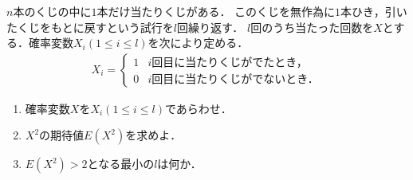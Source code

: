 \documentclass[../../main.tex]{subfiles}
\begin{document}
$n$本のくじの中に$1$本だけ当たりくじがある．
このくじを無作為に$1$本ひき，引いたくじをもとに戻すという試行を$l$回繰り返す．
$l$回のうち当たった回数を$X$とする．確率変数$X_i (1\le i\le l)$を次により定める．
\begin{align*}
  X_i=
  \begin{cases}
    1 & \text{$i$回目に当たりくじがでたとき，}  \\
    0 & \text{$i$回目に当たりくじがでないとき．}
  \end{cases}
\end{align*}
\begin{enumerate}
  \item 確率変数$X$を$X_i (1\le i\le l)$であらわせ．
  \item $X^2$の期待値$E(X^2)$を求めよ．
  \item $E(X^2)>2$となる最小の$l$は何か．
\end{enumerate}
\end{document}
